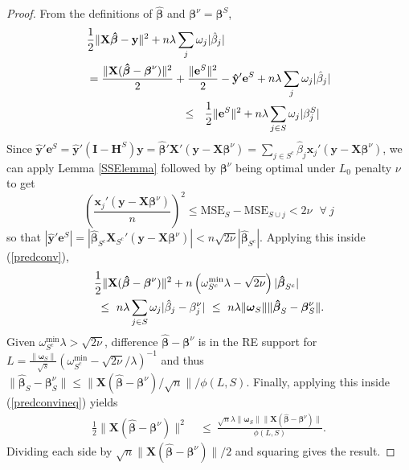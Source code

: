 \documentclass[twoside]{article}
\newcommand{\bs}[1]{\boldsymbol{#1}}
\newcommand{\mr}[1]{\mathrm{#1}}
\newcommand{\bm}[1]{\mathbf{#1}}
\begin{document}
\begin{proof}
From the definitions of $\bs{\hat\beta}$ and $\bs{\beta}^\nu = \bs{\beta}^S$, 
\begin{align}\label{predconv}&
\frac{1}{2}\|\bm{X}\bs{\hat \beta}-\bm{y}\|^2 +  n\lambda\sum_j\omega_j|\hat\beta_j|  \\ &= \frac{\|\bm{X}(\bs{\hat\beta}-\bs{\beta}^\nu)\|^2}{2} + \frac{\|\bm{e}^S\|^2}{2} - \bm{\hat y}'\bm{e}^S+ n\lambda\sum_j\omega_j|\hat\beta_j|\notag\\
&\hspace{3cm}\leq~~\frac{1}{2}\|\bm{e}^S\|^2 + n\lambda\sum_{j\in S}\omega_j|\beta^S_j|\notag
\end{align}
  Since $\bm{\hat y}'\bm{e}^S = \bm{\hat y}'(\bm{I}-\bm{H}^S)\bm{y} =
\bs{\hat\beta}'\bm{X}'(\bm{y}-\bm{X}\bs{\beta}^\nu) = 
\sum_{j\in S^c} \hat\beta_j\bs{x}_j'(\bm{y}-\bm{X}\bs{\beta}^\nu)
$,
 we can apply Lemma \ref{SSElemma} followed by $\bs{\beta}^\nu$ being optimal under $L_0$ penalty $\nu$ to get 
\begin{equation} \label{L0ineq}
\left(\frac{\bs{x}_j'(\bm{y}-\bm{X}\bs{\beta}^\nu)}{n}\right)^2
\leq \mr{MSE}_S - \mr{MSE}_{S\cup j} < 2\nu ~~~\forall~j
\end{equation}
so that $|\bm{\hat y}'\bm{e}^S| = |\bs{\hat\beta}_{S^c}\bm{X}_{S^c}'(\bm{y}-\bm{X}\bs{\beta}^\nu)| < n\sqrt{2\nu}|\bs{\hat\beta}_{S^c}|$.  Applying this inside (\ref{predconv}),
\begin{align}\label{predconvineq}&
\frac{1}{2}\|\bm{X}(\bs{\hat\beta}-\bs{\beta}^\nu)\|^2
  + n\left(\omega^{\mr{min}}_{S^c}\lambda-\sqrt{2\nu}\right)|\bs{\hat\beta}_{S^c}|\\
  &~\leq~ n\lambda\sum_{j\in S}\omega_j|\hat\beta_{j}-\beta^\nu_j|
  ~\leq~ n\lambda\|\bs{\omega}_S\|\|\bs{\hat\beta}_{S}-\bs{\beta}^\nu_S\|.\notag
\end{align}
Given $\omega^{\mr{min}}_{S^c}\lambda > \sqrt{2\nu}$,
difference $\bs{\hat\beta}-\bs{\beta}^\nu$ is in the RE support for 
$L=\frac{\|\bs{\omega}_S\|}{\sqrt{s}}(\omega^{\mr{min}}_{S^c}-\sqrt{2\nu}/\lambda)^{-1}$ and thus $\|\bs{\hat\beta}_{S}-\bs{\beta}^\nu_S\| \leq \|\bm{X}(\bs{\hat\beta}-\bs{\beta}^\nu)/\sqrt{n}\|/\phi(L,S)$.  Finally, applying this inside (\ref{predconvineq}) yields
\begin{align}
\frac{1}{2}\|\bm{X}(\bs{\hat\beta}-\bs{\beta}^\nu)\|^2
  &~\leq~ \frac{\sqrt{n}\lambda\|\bs{\omega}_S\|\|\bm{X}(\bs{\hat\beta}-\bs{\beta}^\nu)\|}
  {\phi(L, S)}.
\end{align}
Dividing each side by $\sqrt{n}\|\bm{X}(\bs{\hat\beta}-\bs{\beta}^\nu)\|/2$ and squaring gives the result.
\end{proof}
\end{document}

